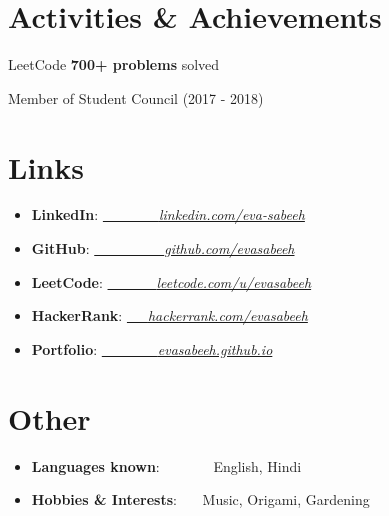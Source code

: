 \documentclass[a4paper,20pt]{article}
\newcommand{\resumeItem}[2]{
  \item\small{
    \textbf{#1}{: #2 \vspace{-2pt}}
  }
}
\newcommand{\resumeSubItem}[2]{\resumeItem{#1}{#2}\vspace{-3pt}}
\newcommand{\resumeSubHeadingListStart}{\begin{itemize}[leftmargin=*]}
\newcommand{\resumeSubHeadingListEnd}{\end{itemize}}
\begin{document}
\section{Activities \& Achievements}
\begin{description}[font=$\bullet$]
  \item {LeetCode \textbf{700+ problems} solved}
  \vspace{-5pt}
  \item {Member of Student Council (2017 - 2018)}
  \vspace{-5pt}
  \end{description}
\vspace{2pt}



\section{Links}
\resumeSubHeadingListStart
\resumeSubItem{LinkedIn}{\href{https://www.linkedin.com/in/eva-sabeeh/}{~~~~~~~~\emph{linkedin.com/eva-sabeeh}}}
\vspace{-1pt}
\resumeSubItem{GitHub}{\href{https://www.github.com/evasabeeh/}{~~~~~~~~~~\emph{github.com/evasabeeh}}}
\vspace{-1pt}
\resumeSubItem{LeetCode}{\href{https://www.leetcode.com/u/evasabeeh/}{~~~~~~~\emph{leetcode.com/u/evasabeeh}}}
\vspace{-1pt}
\resumeSubItem{HackerRank}{\href{https://www.hackerrank.com/profile/evasabeeh}{~~~\emph{hackerrank.com/evasabeeh}}}
\vspace{-1pt}
\resumeSubItem{Portfolio}{\href{https://evasabeeh.github.io/}{~~~~~~~~\emph{evasabeeh.github.io}}}
\vspace{-1pt}
\resumeSubHeadingListEnd
\vspace{2pt}



\section{Other}
\resumeSubHeadingListStart
\resumeSubItem{Languages known}{~~~~~~~English, Hindi}
\vspace{-1pt}
\resumeSubItem{Hobbies \& Interests}{~~~Music, Origami, Gardening}
\resumeSubHeadingListEnd
\vspace{2pt}
\end{document}
